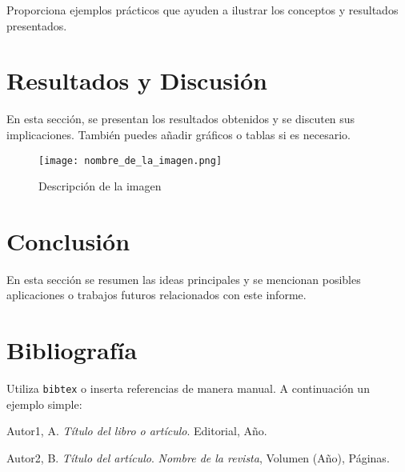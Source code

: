 \documentclass[a4paper,12pt]{article}
\begin{document}
Proporciona ejemplos prácticos que ayuden a ilustrar los conceptos y resultados presentados.

\section{Resultados y Discusión}

En esta sección, se presentan los resultados obtenidos y se discuten sus implicaciones. También puedes añadir gráficos o tablas si es necesario.

\begin{figure}[h]
    \centering
    \texttt{[image: nombre\_de\_la\_imagen.png]}
    \caption{Descripción de la imagen}
    \label{fig:imagen}
\end{figure}

\section{Conclusión}

En esta sección se resumen las ideas principales y se mencionan posibles aplicaciones o trabajos futuros relacionados con este informe.

\section{Bibliografía}

Utiliza \texttt{bibtex} o inserta referencias de manera manual. A continuación un ejemplo simple:

\begin{thebibliography}{9}

Autor1, A. \textit{Título del libro o artículo}. Editorial, Año.

Autor2, B. \textit{Título del artículo}. \textit{Nombre de la revista}, Volumen (Año), Páginas.

\end{thebibliography}
\end{document}
